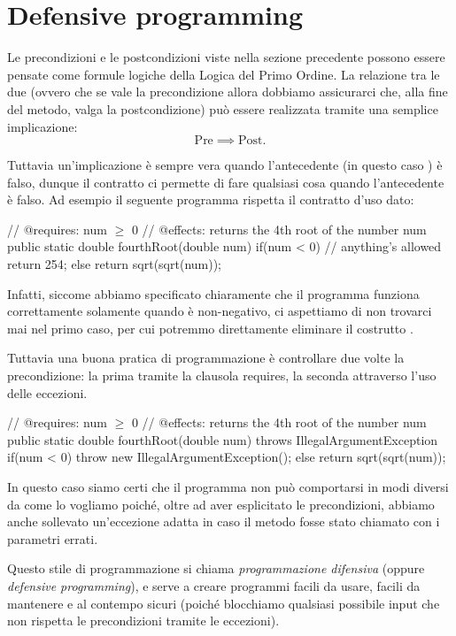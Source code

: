 \section{Defensive programming}
Le precondizioni e le postcondizioni viste nella sezione precedente possono essere pensate come formule logiche della Logica del Primo Ordine. La relazione tra le due (ovvero che se vale la precondizione allora dobbiamo assicurarci che, alla fine del metodo, valga la postcondizione) può essere realizzata tramite una semplice implicazione: \[
    \text{Pre} \implies \text{Post}.    
\]

Tuttavia un'implicazione è sempre vera quando l'antecedente (in questo caso ) è falso, dunque il contratto ci permette di fare qualsiasi cosa quando l'antecedente è falso. Ad esempio il seguente programma rispetta il contratto d'uso dato:
\begin{Java}
    // @requires: num $\geq$ 0
    // @effects: returns the 4th root of the number num
    public static double fourthRoot(double num) {
        if(num < 0) {       // anything's allowed
            return 254;
        } else {
            return sqrt(sqrt(num));
        }
    }
\end{Java}
Infatti, siccome abbiamo specificato chiaramente che il programma funziona correttamente solamente quando  è non-negativo, ci aspettiamo di non trovarci mai nel primo caso, per cui potremmo direttamente eliminare il costrutto .

Tuttavia una buona pratica di programmazione è controllare due volte la precondizione: la prima tramite la clausola requires, la seconda attraverso l'uso delle eccezioni.
\begin{Java}
    // @requires: num $\geq$ 0
    // @effects: returns the 4th root of the number num
    public static double fourthRoot(double num)
                throws IllegalArgumentException {
        if(num < 0) {
            throw new IllegalArgumentException();
        } else {
            return sqrt(sqrt(num));
        }
    }
\end{Java}
In questo caso siamo certi che il programma non può comportarsi in modi diversi da come lo vogliamo poiché, oltre ad aver esplicitato le precondizioni, abbiamo anche sollevato un'eccezione adatta in caso il metodo fosse stato chiamato con i parametri errati.

Questo stile di programmazione si chiama \emph{programmazione difensiva} (oppure \emph{defensive programming}), e serve a creare programmi facili da usare, facili da mantenere e al contempo sicuri (poiché blocchiamo qualsiasi possibile input che non rispetta le precondizioni tramite le eccezioni).

